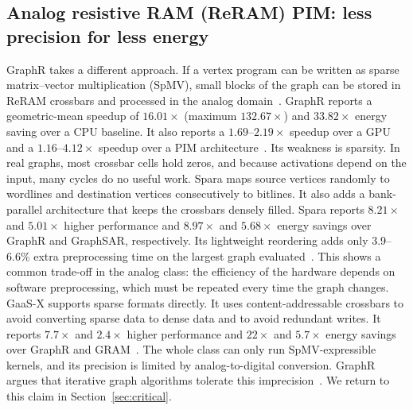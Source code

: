 \documentclass[journal,onecolumn]{IEEEtran}
\begin{document}
\subsection{Analog resistive RAM (ReRAM) PIM: less precision for less energy}
GraphR takes a different approach. If a vertex program can be written as sparse matrix--vector multiplication (SpMV), small blocks of the graph can be stored in ReRAM crossbars and processed in the analog domain~\cite{song2018graphr}. GraphR reports a geometric-mean speedup of $16.01\times$ (maximum $132.67\times$) and $33.82\times$ energy saving over a CPU baseline. It also reports a $1.69$--$2.19\times$ speedup over a GPU and a $1.16$--$4.12\times$ speedup over a PIM architecture~\cite{song2018graphr}. Its weakness is sparsity. In real graphs, most crossbar cells hold zeros, and because activations depend on the input, many cycles do no useful work. Spara maps source vertices randomly to wordlines and destination vertices consecutively to bitlines. It also adds a bank-parallel architecture that keeps the crossbars densely filled. Spara reports $8.21\times$ and $5.01\times$ higher performance and $8.97\times$ and $5.68\times$ energy savings over GraphR and GraphSAR, respectively. Its lightweight reordering adds only 3.9--6.6\% extra preprocessing time on the largest graph evaluated~\cite{zheng2020spara}. This shows a common trade-off in the analog class: the efficiency of the hardware depends on software preprocessing, which must be repeated every time the graph changes. GaaS-X supports sparse formats directly. It uses content-addressable crossbars to avoid converting sparse data to dense data and to avoid redundant writes. It reports $7.7\times$ and $2.4\times$ higher performance and $22\times$ and $5.7\times$ energy savings over GraphR and GRAM~\cite{challapalle2020gaasx}. The whole class can only run SpMV-expressible kernels, and its precision is limited by analog-to-digital conversion. GraphR argues that iterative graph algorithms tolerate this imprecision~\cite{song2018graphr}. We return to this claim in Section~\ref{sec:critical}.
\end{document}
